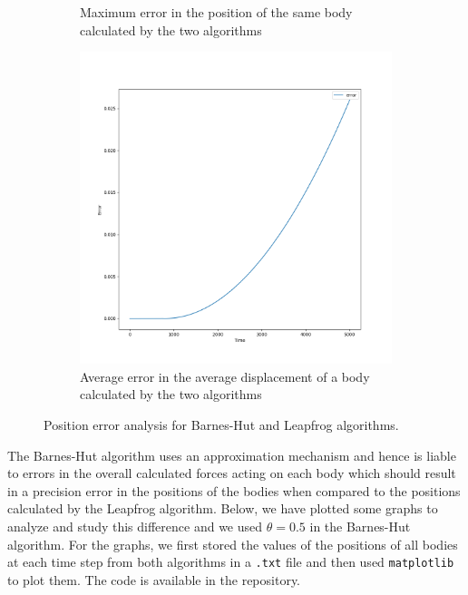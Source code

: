 \documentclass[12pt]{article}
\begin{document}
\begin{figure}[hbt!]
\begin{subfigure}[b]{0.49\textwidth}
        \caption{Maximum error in the position of the same body calculated by the two algorithms}
        \label{figure:error-max}
    \end{subfigure}
    \hfill
    \begin{subfigure}[b]{0.49\textwidth}
        \centering
        \includegraphics[width=\textwidth]{images/error.png}
        \caption{Average error in the average displacement of a body calculated by the two algorithms}
        \label{figure:error}
    \end{subfigure}
    \caption{Position error analysis for Barnes-Hut and Leapfrog algorithms.}
    \label{figure:power}
\end{figure}  

The Barnes-Hut algorithm uses an approximation mechanism and hence is liable to errors in the overall calculated forces acting on each body which should result in a precision error in the positions of the bodies when compared to the positions calculated by the Leapfrog algorithm. Below, we have plotted some graphs to analyze and study this difference and we used $\theta=0.5$ in the Barnes-Hut algorithm. For the graphs, we first stored the values of the positions of all bodies at each time step from both algorithms in a \verb|.txt| file and then used \verb|matplotlib| to plot them. The code is available in the repository.
\end{document}
